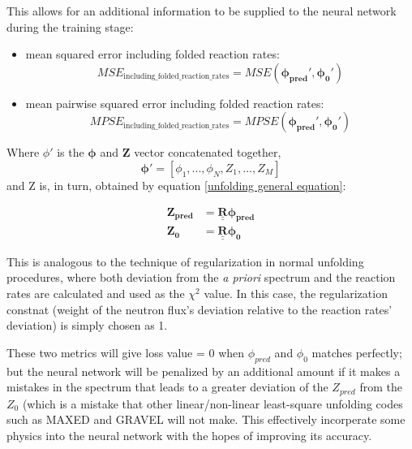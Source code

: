 \documentclass[a4paper, 12pt]{article}
\newcommand{\matr}[1]{\underline{\underline{\textbf{#1}}}}
\newcommand{\ve}[1]{\boldsymbol{#1}}
\begin{document}
    This allows for an additional information to be supplied to the neural network during the training stage:
        
    \begin{itemize}
        \item mean squared error including folded reaction rates:
        \begin{equation}
            MSE_{\text{including\_folded\_reaction\_rates}}=MSE(\ve{\phi_{pred}'},\ve{\phi_{0}'})
        \end{equation}
        \item mean pairwise squared error including folded reaction rates:
        \begin{equation}
            MPSE_{\text{including\_folded\_reaction\_rates}} = MPSE(\ve{\phi_{pred}'},\ve{\phi_{0}'})
        \end{equation}
    \end{itemize}
    Where $\phi'$ is the $\ve{\phi}$ and $\ve{Z}$ vector concatenated together,
    \begin{equation}\label{NNregularization}
        \ve{\phi'} = [\phi_1, ..., \phi_N, Z_1, ..., Z_M]
    \end{equation}
    and Z is, in turn, obtained by equation \ref{unfolding general equation}:

    \begin{align*}
        \ve{Z_{pred}} &= \matr{R} \ve{\phi_{pred} }\\
        \ve{Z_{0}} &= \matr{R} \ve{\phi_{0} }
    \end{align*}

    This is analogous to the technique of regularization\cite{FisherRegularization} in normal unfolding procedures, where both deviation from the \emph{a priori} spectrum and the reaction rates are calculated and used as the $\chi^2$ value. In this case, the regularization constnat (weight of the neutron flux's deviation relative to the reaction rates' deviation) is simply chosen as 1.

    These two metrics will give loss value = 0 when $\phi_{pred}$ and $\phi_0$ matches perfectly; but the neural network will be penalized by an additional amount if it makes a mistakes in the spectrum that leads to a greater deviation of the $Z_{pred}$ from the $Z_{0}$ (which is a mistake that other linear/non-linear least-square unfolding codes such as MAXED and GRAVEL will not make. This effectively incorperate some physics into the neural network with the hopes of improving its accuracy.
\end{document}
